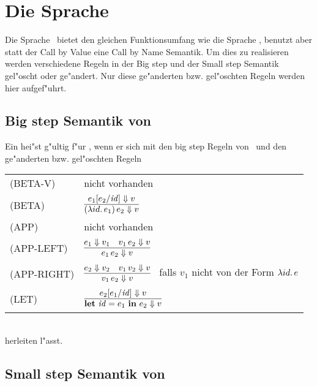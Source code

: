 \section{Die Sprache \LTWOCBN}

Die Sprache \LTWOCBN \ bietet den gleichen Funktionsumfang wie die Sprache \LTWO, benutzt aber statt der 
Call by Value eine Call by Name Semantik. Um dies zu realisieren werden verschiedene Regeln in der Big step 
und der Small step Semantik gel"oscht oder ge"andert. Nur diese ge"anderten bzw. gel"oschten Regeln werden hier
aufgef"uhrt.

\subsection{Big step Semantik von \LTWOCBN}

Ein  hei"st g"ultig f"ur \LTWOCBN, wenn er sich mit den big step Regeln von \LTWO\ und den ge"anderten bzw. gel"oschten Regeln\\[5mm]
  \begin{tabular}{ll}
     \mbox{(BETA-V)}      & nicht vorhanden \\[3mm]
     \mbox{(BETA)}        & $\regel{e_1[e_2/\id] \eval v}
                                   {(\abstr{id}{e_1})\,e_2 \eval v}$ \\[5mm]
     \mbox{(APP)}         & nicht vorhanden \\[3mm]
     \mbox{(APP-LEFT)}    & $\regel{e_1 \eval v_1 \quad v_1\,e_2 \eval v}
                                   {e_1\,e_2 \eval v}$ \\[3mm]
     \mbox{(APP-RIGHT)}   & $\regel{e_2 \eval v_2 \quad v_1\,v_2 \eval v}
                                   {v_1\,e_2 \eval v}$   \ 
                                   falls ${v_1}$ nicht von der Form $\lambda id.\,e$ \\[5mm]
     \mbox{(LET)}         & $\regel{e_2[e_1/\id] \eval v}
                                   {\bli{\id}{e_1}{e_2} \eval v}$
  \end{tabular}\\[7mm]
herleiten l"asst.


\subsection{Small step Semantik von \LTWOCBN}

